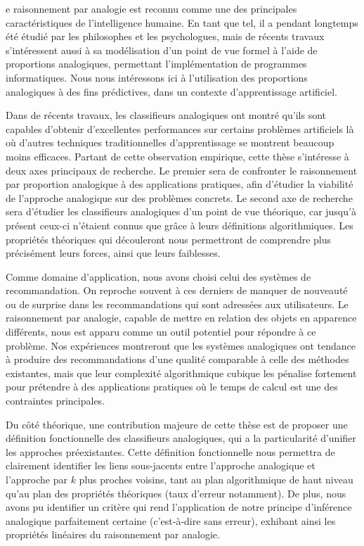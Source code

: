 e raisonnement par analogie est reconnu comme une des principales
caractéristiques de l'intelligence humaine. En tant que tel, il a pendant
longtemps été étudié par les philosophes et les psychologues, mais de récents
travaux s'intéressent aussi à sa modélisation d'un point de vue formel à l'aide
de proportions analogiques, permettant l'implémentation de programmes
informatiques. Nous nous intéressons ici à l'utilisation des proportions
analogiques à des fins prédictives, dans un contexte d'apprentissage
artificiel.

Dans de récents travaux, les classifieurs analogiques ont montré qu'ils sont
capables d'obtenir d'excellentes performances sur certains problèmes
artificiels là où d'autres techniques traditionnelles d'apprentissage se montrent
beaucoup moins efficaces. Partant de cette observation empirique, cette thèse
s'intéresse à deux axes principaux de recherche.  Le premier sera de confronter
le raisonnement par proportion analogique à des applications pratiques, afin
d'étudier la viabilité de l'approche analogique sur des problèmes concrets.
Le second axe de recherche sera d'étudier les classifieurs analogiques d'un
point de vue théorique, car jusqu'à présent ceux-ci n'étaient connus que grâce
à leurs définitions algorithmiques. Les propriétés théoriques qui découleront
nous permettront de comprendre plus précisément leurs forces, ainsi que leurs
faiblesses.

Comme domaine d'application, nous avons choisi celui des systèmes de
recommandation. On reproche souvent à ces derniers de manquer de nouveauté ou
de surprise dans les recommandations qui sont adressées aux utilisateurs. Le
raisonnement par analogie, capable de mettre en relation des objets en
apparence différents, nous est apparu comme un outil potentiel pour répondre à
ce problème. Nos expériences montreront que les systèmes analogiques ont
tendance à produire des recommandations d'une qualité comparable à celle des
méthodes existantes, mais que leur complexité algorithmique cubique les
pénalise fortement pour prétendre à des applications pratiques où le temps de
calcul est une des contraintes principales.

Du côté théorique, une contribution majeure de cette thèse est de proposer une
définition fonctionnelle des classifieurs analogiques, qui a la particularité
d'unifier les approches préexistantes. Cette définition fonctionnelle nous
permettra de clairement identifier les liens sous-jacents entre l'approche
analogique et l'approche par $k$ plus proches voisins, tant au plan
algorithmique de haut niveau qu'au plan des propriétés théoriques (taux
d'erreur notamment). De plus, nous avons pu identifier un critère
qui rend l'application de notre principe d'inférence analogique parfaitement
certaine (c'est-à-dire sans erreur),  exhibant ainsi les propriétés linéaires
du raisonnement par analogie.
